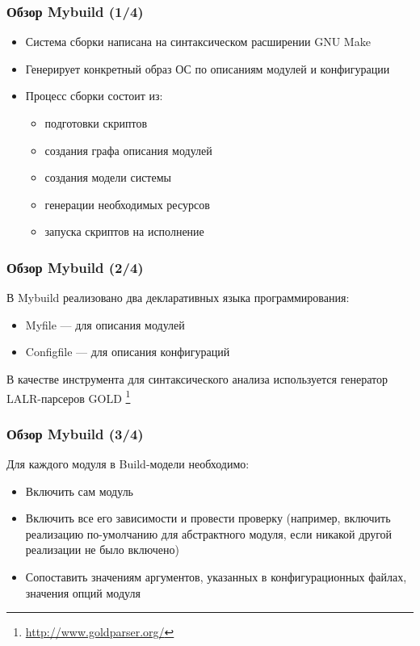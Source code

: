 \documentclass{beamer}
\begin{document}

\begin{frame}
	\frametitle{Обзор Mybuild (1/4)}
	\begin{itemize}
		\item Система сборки написана на синтаксическом расширении GNU Make
		\item Генерирует конкретный образ ОС по описаниям модулей и конфигурации
		\item 	Процесс сборки состоит из:
		      \begin{itemize}
			      \item подготовки скриптов
			      \item создания графа описания модулей
			      \item создания модели системы
			      \item генерации необходимых ресурсов
			      \item запуска скриптов на исполнение
		      \end{itemize}
	\end{itemize}
\end{frame}

\begin{frame}
	\frametitle{Обзор Mybuild (2/4)}
	В Mybuild реализовано два декларативных языка программирования:
	\begin{itemize}
		\item Myfile — для описания модулей
		\item Configfile — для описания конфигураций
	\end{itemize}
	В качестве инструмента для синтаксического анализа используется генератор LALR-парсеров GOLD \footnote{\href{http://www.goldparser.org/}{http://www.goldparser.org/}}
\end{frame}

\begin{frame}
	\frametitle{Обзор Mybuild (3/4)}
	Для каждого модуля в Build-модели необходимо:
	\begin{itemize}
		\item Включить сам модуль
		\item Включить все его зависимости и провести проверку (например, включить реализацию по-умолчанию для абстрактного модуля, если никакой другой реализации не было включено)
		\item Сопоставить значениям аргументов, указанных в конфигурационных файлах, значения опций модуля
	\end{itemize}
\end{frame}
\end{document}
